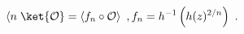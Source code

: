 \begin{equation}
\left<n\right.\ket{\mathcal{O}}=
\left<f_n \circ \mathcal{O}\right> \ ,
f_n=h^{-1}\left(h(z)^{2/n}\right) \ .
\end{equation}

